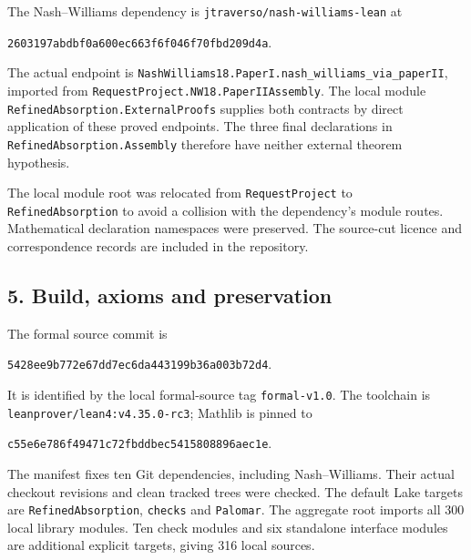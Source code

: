 \documentclass[english,11pt,a4paper]{article}
\begin{document}
The Nash--Williams dependency is \texttt{jtraverso/\allowbreak{}nash-williams-lean} at

\texttt{2603197a\allowbreak{}bdbf0a60\allowbreak{}0ec663f6\allowbreak{}f046f70f\allowbreak{}bd209d4a}.

The actual endpoint is \texttt{Nash\allowbreak{}Williams18.\allowbreak{}Paper\allowbreak{}I.\allowbreak{}nash\_\allowbreak{}williams\_\allowbreak{}via\_\allowbreak{}paper\allowbreak{}II}, imported from \texttt{Request\allowbreak{}Project.\allowbreak{}NW18.\allowbreak{}Paper\allowbreak{}IIAssembly}. The local module \texttt{Refined\allowbreak{}Absorption.\allowbreak{}External\allowbreak{}Proofs} supplies both contracts by direct application of these proved endpoints. The three final declarations in \texttt{Refined\allowbreak{}Absorption.\allowbreak{}Assembly} therefore have neither external theorem hypothesis.

The local module root was relocated from \texttt{Request\allowbreak{}Project} to \texttt{Refined\allowbreak{}Absorption} to avoid a collision with the dependency's module routes. Mathematical declaration namespaces were preserved. The source-cut licence and correspondence records are included in the repository.

\subsection{5. Build, axioms and preservation}\label{build-axioms-and-preservation}

The formal source commit is

\texttt{5428ee9b\allowbreak{}772e67dd\allowbreak{}7ec6da44\allowbreak{}3199b36a\allowbreak{}003b72d4}.

It is identified by the local formal-source tag \texttt{formal-v1.\allowbreak{}0}. The toolchain is \texttt{leanprover/\allowbreak{}lean4:v4.\allowbreak{}35.\allowbreak{}0-rc3}; Mathlib is pinned to

\texttt{c55e6e78\allowbreak{}6f49471c\allowbreak{}72fbddbe\allowbreak{}c5415808\allowbreak{}896aec1e}.

The manifest fixes ten Git dependencies, including Nash--Williams. Their actual checkout revisions and clean tracked trees were checked. The default Lake targets are \texttt{Refined\allowbreak{}Absorption}, \texttt{checks} and \texttt{Palomar}. The aggregate root imports all 300 local library modules. Ten check modules and six standalone interface modules are additional explicit targets, giving 316 local sources.
\end{document}
